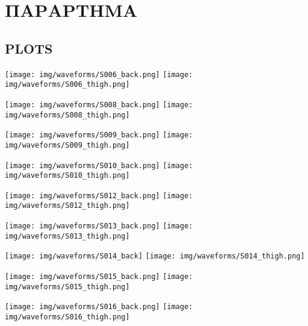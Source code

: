 \pagebreak
\chapter{ΠΑΡΑΡΤΗΜΑ}
    \section{PLOTS}

        \begin{multicols}{2} \centering \noindent
            \texttt{[image: img/waveforms/S006\_back.png]}
            \texttt{[image: img/waveforms/S006\_thigh.png]}
        \end{multicols}
        \begin{multicols}{2} \centering \noindent
            \texttt{[image: img/waveforms/S008\_back.png]}
            \texttt{[image: img/waveforms/S008\_thigh.png]}
        \end{multicols}
        \begin{multicols}{2} \centering \noindent
            \texttt{[image: img/waveforms/S009\_back.png]}
            \texttt{[image: img/waveforms/S009\_thigh.png]}
        \end{multicols}
        \pagebreak

        \begin{multicols}{2} \centering \noindent
            \texttt{[image: img/waveforms/S010\_back.png]}
            \texttt{[image: img/waveforms/S010\_thigh.png]}
        \end{multicols}
        \begin{multicols}{2} \centering \noindent
            \texttt{[image: img/waveforms/S012\_back.png]}
            \texttt{[image: img/waveforms/S012\_thigh.png]}
        \end{multicols}
        \begin{multicols}{2} \centering \noindent
            \texttt{[image: img/waveforms/S013\_back.png]}
            \texttt{[image: img/waveforms/S013\_thigh.png]}
        \end{multicols}
        \pagebreak

        \begin{multicols}{2} \centering \noindent
            \texttt{[image: img/waveforms/S014\_back]}
            \texttt{[image: img/waveforms/S014\_thigh.png]}
        \end{multicols}
        \begin{multicols}{2} \centering \noindent
            \texttt{[image: img/waveforms/S015\_back.png]}
            \texttt{[image: img/waveforms/S015\_thigh.png]}
        \end{multicols}
        \begin{multicols}{2} \centering \noindent
            \texttt{[image: img/waveforms/S016\_back.png]}
            \texttt{[image: img/waveforms/S016\_thigh.png]}
        \end{multicols}
        \pagebreak

